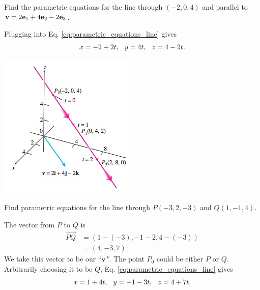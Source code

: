 \documentclass[12pt,letterpaper,reqno]{article}
\numberwithin{equation}{section}
\begin{document}
\begin{example}
Find the parametric equations for the line through $(-2,0,4)$ and parallel to ${\bf v}=2{\bf e}_1+4{\bf e}_2-2{\bf e}_3$.	
\end{example}

{\color{red} 
Plugging into Eq. \eqref{eq:parametric_equations_line} gives
\begin{align*}
	x=-2+2t, \hspace{0.25cm} y=4t, \hspace{0.25cm} z=4-2t.
\end{align*}}
\begin{center}
	\includegraphics[scale=0.5]{figures_mvc/parametrized_line_example_1}
\end{center}

\begin{example}
	Find parametric equations for the line through $P(-3,2,-3)$ and $Q(1,-1,4)$.
\end{example}

{\color{red} 
The vector from $P$ to $Q$ is 
\begin{align*}
	\overrightarrow{PQ}&=(1-(-3), -1-2, 4-(-3)) \\
	&=(4,-3,7).
\end{align*}
We take this vector to be our ``${\bf v}$". The point $P_0$ could be either $P$ or $Q$. Arbitrarily choosing it to be $Q$, Eq. \eqref{eq:parametric_equations_line} gives
\begin{align*}
	x=1+4t, \hspace{0.25cm} y=-1-3t, \hspace{0.25cm} z=4+7t.
\end{align*}}
\end{document}
